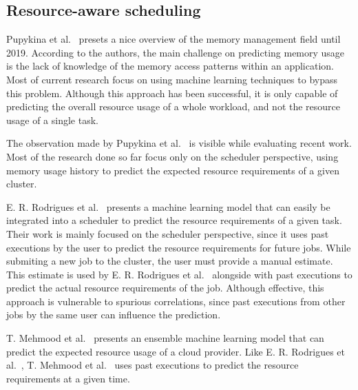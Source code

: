 \subsection{Resource-aware scheduling}
\label{subsec:resource-aware-scheduling}

Pupykina et al.~\cite{pupykina2019} presets a nice overview of the memory management field until 2019.
According to the authors, the main challenge on predicting memory usage is the lack of knowledge of the memory access patterns within an application.
Most of current research focus on using machine learning techniques to bypass this problem.
Although this approach has been successful, it is only capable of predicting the overall resource usage of a whole workload, and not the resource usage of a single task.

The observation made by Pupykina et al.~\cite{pupykina2019} is visible while evaluating recent work.
Most of the research done so far focus only on the scheduler perspective, using memory usage history to predict the expected resource requirements of a given cluster.

E. R. Rodrigues et al.~\cite{rodrigues2016} presents a machine learning model that can easily be integrated into a scheduler to predict the resource requirements of a given task.
Their work is mainly focused on the scheduler perspective, since it uses past executions by the user to predict the resource requirements for future jobs.
While submiting a new job to the cluster, the user must provide a manual estimate.
This estimate is used by E. R. Rodrigues et al.~\cite{rodrigues2016} alongside with past executions to predict the actual resource requirements of the job.
Although effective, this approach is vulnerable to spurious correlations, since past executions from other jobs by the same user can influence the prediction.

T. Mehmood et al.~\cite{mehmood2018} presents an ensemble machine learning model that can predict the expected resource usage of a cloud provider.
Like E. R. Rodrigues et al.~\cite{rodrigues2016}, T. Mehmood et al.~\cite{mehmood2018} uses past executions to predict the resource requirements at a given time.


